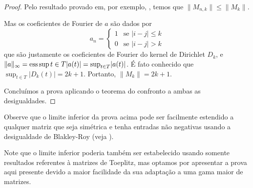 \begin{proof}
  Pelo resultado provado em, por exemplo, \cite[p. 52]{bottcher}, temos que $\| M_{n,k} \| \le \| M_k \|$.

  Mas os coeficientes de Fourier de $a$ são dados por \[a_n = \begin{cases} 1 & \text{se } \lvert i - j\rvert \le k \\ 0 & \text{se } \lvert i - j\rvert > k \end{cases} \] que são justamente os coeficientes de Fourier do kernel de Dirichlet $D_k$, e $\| a \|_{\infty} = \operatorname*{ess\,sup}{t \in T} \lvert a(t)\rvert = \sup_{t \in T} \lvert a(t)\rvert$. É fato conhecido que $\sup_{t \in T} \lvert D_k(t)\rvert = 2k + 1$. Portanto, $\| M_k \| = 2k + 1$.

  Concluímos a prova aplicando o teorema do confronto a ambas as desigualdades.
\end{proof}

Observe que o limite inferior da prova acima pode ser facilmente estendido a qualquer matriz que seja simétrica e tenha entradas não negativas usando a desigualdade de Blakley-Roy (veja \cite{blakley-roy}).

Note que o limite inferior poderia também ser estabelecido usando somente resultados referentes à matrizes de Toeplitz, mas optamos por apresentar a prova aqui presente devido a maior facilidade da sua adaptação a uma gama maior de matrizes.
